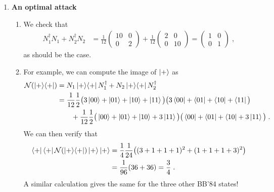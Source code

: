 \documentclass[12pt]{article}
\begin{document}
\begin{enumerate}
		
\item {\bf An optimal attack}\label{ex:opt-wiesner}
 
\begin{enumerate}
\item We check that 
\begin{align*}
N_1^\dagger N_1 + N_2^\dagger N_2  &= \frac{1}{12}\begin{pmatrix} 10 & 0 \\ 0 & 2 \end{pmatrix}+\frac{1}{12} \begin{pmatrix} 2 & 0 \\ 0 & 10 \end{pmatrix} = \begin{pmatrix} 1 & 0 \\ 0 & 1\end{pmatrix}\;,
\end{align*}
as should be the case. 
\item For example, we can compute the image of $\ket{+}$ as 
\begin{align*} 
\mathcal{N}(\ket{+}\!\bra{+}) &= N_1 \ket{+}\!\bra{+} N_1^\dagger + N_2 \ket{+}\!\bra{+}N_2^\dagger \\
&= \frac{1}{12} \frac{1}{2}\big( 3\ket{00} + \ket{01} + \ket{10} + \ket{11} \big)\big( 3\bra{00} + \bra{01} + \bra{10} + \bra{11} \big)\\
&\qquad +\frac{1}{12} \frac{1}{2}\big( \ket{00} + \ket{01} + \ket{10} + 3\ket{11} \big)\big( \bra{00} + \bra{01} + \bra{10} + 3\ket{11} \big)\;.
\end{align*}
We can then verify that 
\begin{align*}
\bra{+}\bra{+}\mathcal{N}(\ket{+}\!\bra{+})\ket{+}\ket{+} &= \frac{1}{4}\frac{1}{24}\big( (3+1+1+1)^2 + (1+1+1+3)^2 \big)\\
&= \frac{1}{96}( 36+36) = \frac{3}{4}\;.
\end{align*}
A similar calculation gives the same for the three other BB'84 states!
\end{enumerate}







\end{enumerate}
\end{document}
